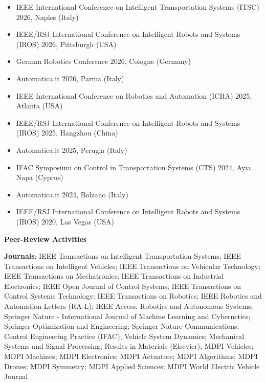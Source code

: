 \begin{itemize}
    \item IEEE International Conference on Intelligent Transportation Systems (ITSC) 2026, Naples (Italy)
    \item IEEE/RSJ International Conference on Intelligent Robots and Systems (IROS) 2026, Pittsburgh (USA) 
    \item German Robotics Conference 2026, Cologne (Germany)
    \item Automatica.it 2026, Parma (Italy)
    \item IEEE International Conference on Robotics and Automation (ICRA) 2025, Atlanta (USA)
    \item IEEE/RSJ International Conference on Intelligent Robots and Systems (IROS) 2025, Hangzhou (China)
    \item Automatica.it 2025, Perugia (Italy)
    \item IFAC Symposium on Control in Transportation Systems (CTS) 2024, Ayia Napa (Cyprus)
    \item Automatica.it 2024, Bolzano (Italy)
    \item IEEE/RSJ International Conference on Intelligent Robots and Systems (IROS) 2020, Las Vegas (USA) 
\end{itemize}

\vspace{0.2cm}
{\large\bfseries\sffamily Peer-Review Activities}

\vspace{0.3cm}
{\normalsize\bfseries\sffamily Journals}: 
IEEE Transactions on Intelligent Transportation Systems; IEEE Transactions on Intelligent Vehicles; IEEE Transactions on Vehicular Technology; IEEE Transactions on Mechatronics; IEEE Transactions on Industrial Electronics; IEEE Open Journal of Control Systems; IEEE Transactions on Control Systems Technology; IEEE Transactions on Robotics; IEEE Robotics and Automation Letters (RA-L); IEEE Access; Robotics and Autonomous Systems; Springer Nature - International Journal of Machine Learning and Cybernetics; Springer Optimization and Engineering; Springer Nature Communications; Control Engineering Practice (IFAC); Vehicle System Dynamics; Mechanical Systems and Signal Processing; Results in Materials (Elsevier); MDPI Vehicles; MDPI Machines; MDPI Electronics; MDPI Actuators; MDPI Algorithms; MDPI Drones; MDPI Symmetry; MDPI Applied Sciences; MDPI World Electric Vehicle Journal 

